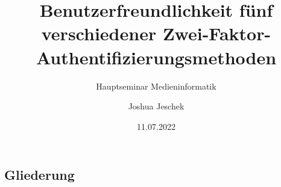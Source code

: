 \usepackage[T1]{fontenc}
\usepackage[utf8]{inputenc}
\usepackage[ngerman]{babel}
\usepackage{tikz} %
\usepackage{enotez} %
\usepackage[nobiblatex]{xurl} %
\usepackage{pgfplotstable} %
\usepackage{ tipa } %

\usepackage{nameref}
\makeatletter
\newcommand*{\currentsectionname}{\@currentlabelname}
\makeatother



\graphicspath{ {./images/} }

\nocite{*}


\newcommand{\Title}{Benutzerfreundlichkeit fünf verschiedener Zwei-Faktor-Authentifizierungsmethoden}
\newcommand{\ShortTitle}{Zwei-Faktor-Authentifizierungsmethoden}
\title[\ShortTitle]{\Title}
\subtitle{Hauptseminar Medieninformatik}
\author{Joshua Jeschek}
\date{11.07.2022}



\tucthreeheadlines{}
\frame{\titlepage}

\tuctwoheadlines{}


\subsection*{Gliederung}
\frame{\frametitle{\currentsectionname}\tableofcontents}

%
%




